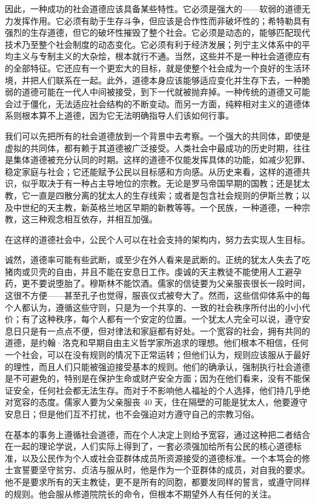 因此，一种成功的社会道德应该具备某些特性。它必须是强大的——软弱的道德无力发挥作用。它必须有助于生存斗争，但应该是合作性而非破坏性的；希特勒具有强烈的生存道德，但它的破坏性摧毁了整个社会。它必须是动态的，能够匹配现代技术乃至整个社会制度的动态变化。它必须有利于经济发展；列宁主义体系中的平均主义与专制主义的大杂烩，根本就行不通。当然，这些并不是一种社会道德应有的全部特征。它还应有一个更宏大的目标，就是使整个社会成为一个良好的生活环境，并把人们联系在一起。此外，道德本身应该能够适应变化并生存下去，一种脆弱的道德可能在一代人中间被接受，到下一代就被抛弃掉。一种传统的道德又可能会过于僵化，无法适应社会结构的不断变动。而另一方面，纯粹相对主义的道德体系则根本算不上道德，因为它无法明确指导人们该如何行事。

我们可以先把所有的社会道德放到一个背景中去考察。一个强大的共同体，即使是虚拟的共同体，都有赖于其道德被广泛接受。人类社会中最成功的历史时期，往往是集体道德被充分认同的时期。这样的道德不仅能发挥具体的功能，如减少犯罪、稳定家庭与社会；它还能赋予公民以目标感和方向感。从历史来看，这样的道德共识，似乎取决于有一种占主导地位的宗教。无论是罗马帝国早期的国教；还是犹太教，它一直是四散分离的犹太人的生存线索；或者是包含社会规则的伊斯兰教；以及中世纪的天主教，新英格兰地区早期的新教等等。一个民族，一种道德，一种宗教，这三种观念相互依存，并相互加强。

在这样的道德社会中，公民个人可以在社会支持的架构内，努力去实现人生目标。

诚然，道德率可能有些武断，或至少在外人看来是武断的。正统的犹太人失去了吃猪肉或贝壳的自由，并且不能在安息日工作。虔诚的天主教徒不能使用人工避孕药，更不要说堕胎了。穆斯林不能饮酒。儒家的信徒要为父亲服丧很长一段时间，这很不方便——甚至孔子也觉得，服丧仪式被夸大了。然而，这些信仰体系中的每个人都认为，遵循这些守则，只是为一个共享的、一致的社会秩序所付出的小小代价；有了这种秩序，每个人都有一个安定的位置。一个犹太人完全可以说，遵守安息日只是有一点点不便，但对律法和家庭都有好处。一个宽容的社会，拥有共同的道德，是约翰·洛克和早期自由主义哲学家所追求的理想。他们根本不相信，任何一个社会，可以在没有规则的情况下正常运转；但他们认为，规则应该服从于最好的理性，而且人们只能被强迫接受基本的规则。他们的确承认，强制执行社会道德是不可避免的，特别是在保护生命或财产安全方面；因为在他们看来，没有不能保证安全，任何社会都无法生存。而对于不影响他人福祉的个人选择，他们持几乎绝对宽容的态度。儒家人要为父亲服丧 40 天，住在隔壁的可能是犹太人，他要遵守安息日；但是他们互不打扰，也不会强迫对方遵守自己的宗教习俗。

在基本的事务上遵循社会道德，而在个人决定上则给予宽容，通过这种把二者结合在一起的理论学说，人们实际上得到了，一套必须强加给所有公民的核心道德标准，以及公民作为个人或社会亚群体成员所资源接受的道德标准。一个本笃会的修士宣誓要坚守贫穷、贞洁与服从时，他是作为一个亚群体的成员，对自我的要求。他不是要求所有的天主教徒，更不是所有的同胞，都要发同样的誓言，或遵守同样的规则。他会服从修道院院长的命令，但根本不期望外人有任何的关注。

